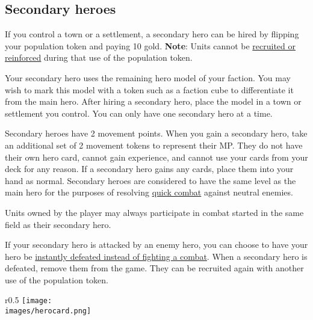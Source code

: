 \documentclass[12pt]{article}
\def\assets{assets}
\def\images{\assets/images}
\begin{document}
\subsection*{\hypertarget{Secondary}{Secondary heroes}}
If you control a town or a settlement, a secondary hero can be hired by flipping your population token and paying 10 gold. \textbf{Note}: Units cannot be \hyperlink{Units}{recruited or reinforced} during that use of the population token.\par
Your secondary hero uses the remaining hero model of your faction. You may wish to mark this model with a token such as a faction cube to differentiate it from the main hero. After hiring a secondary hero, place the model in a town or settlement you control. You can only have one secondary hero at a time.\par
Secondary heroes have 2 movement points. When you gain a secondary hero, take an additional set of 2 movement tokens to represent their MP. They do not have their own hero card, cannot gain experience, and cannot use your cards from your deck for any reason. If a secondary hero gains any cards, place them into your hand as normal.
Secondary heroes are considered to have the same level as the main hero for the purposes of resolving \hyperlink{Quick}{quick combat} against neutral enemies.\par
Units owned by the player may always participate in combat started in the same field as their secondary hero.\par
If your secondary hero is attacked by an enemy hero, you can choose to have your hero be \hyperlink{Endcombat}{instantly defeated instead of fighting a combat}. When a secondary hero is defeated, remove them from the game. They can be recruited again with another use of the population token.\par

\clearpage

\begin{wrapfigure}{r}{0.5\textwidth}
\texttt{[image: \\images/herocard.png]}
\end{wrapfigure}
\end{document}
